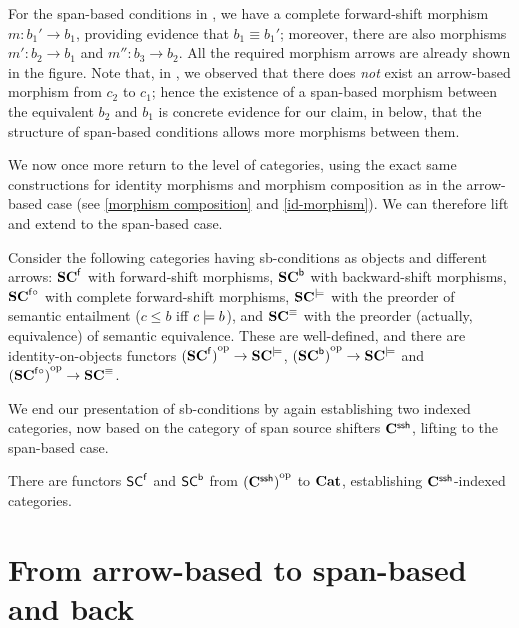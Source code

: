 %
\begin{example}
For the span-based conditions in , we have a complete forward-shift morphism $m:b_1'\to b_1$, providing evidence that $b_1\equiv b_1'$; moreover, there are also morphisms $m':b_2\to b_1$ and $m'':b_3\to b_2$. All the required morphism arrows are already shown in the figure. Note that, in , we observed that there does \emph{not} exist an arrow-based morphism from $c_2$ to $c_1$; hence the existence of a span-based morphism between the equivalent $b_2$ and $b_1$ is concrete evidence for our claim, in  below, that the structure of span-based conditions allows more morphisms between them.
\end{example}
%
We now once more return to the level of categories, using the exact same constructions for identity morphisms and morphism composition as in the arrow-based case (see \eqref{morphism composition} and \eqref{id-morphism}).
We can therefore lift and extend  to the span-based case.

\begin{theorem}
Consider the following categories having sb-conditions as objects and different arrows: 
$\mathbf{SC}^{\mathsf{f}}$ with forward-shift morphisms, $\mathbf{SC}^{{\mathsf{b}}}$ with backward-shift morphisms, $\mathbf{SC}^{{\mathsf{f}}{\circ}}$ with complete forward-shift morphisms, $\mathbf{SC}^{\models}$ with the preorder of semantic entailment ($c \leq b$ iff $c\models b$), and $\mathbf{SC}^\equiv$ with the preorder (actually, equivalence) of semantic equivalence. These are well-defined, and there are identity-on-objects functors ${(\mathbf{SC}^{\mathsf{f}})}^{\mathrm{op}} \rightarrow \mathbf{SC}^{\models}$, ${(\mathbf{SC}^{\mathsf{b}})}^{\mathrm{op}} \rightarrow \mathbf{SC}^{\models}$ and ${(\mathbf{SC}^{{\mathsf{f}}{\circ}})}^{\mathrm{op}} \rightarrow \mathbf{SC}^{\equiv}$.
\end{theorem}
%
We end our presentation of sb-conditions by again establishing two indexed categories, now based on the category of span source shifters $\mathbf{C}^{\mathsf{ssh}}$, lifting  to the span-based case.

\begin{proposition}
There are functors $\mathsf{SC}^{\mathsf{f}}$ and $\mathsf{SC}^{\mathsf{b}}$ from ${(\mathbf{C}^{\mathsf{ssh}})}^{\mathrm{op}}$ to $\mathbf{Cat}$, establishing $\mathbf{C}^{\mathsf{ssh}}$-indexed categories.
\end{proposition}

\section{From arrow-based to span-based and back}

